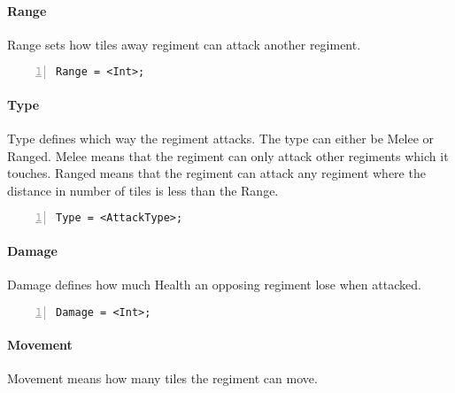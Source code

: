 		\paragraph{Range}
			Range sets how tiles away regiment can attack another regiment.

		\begin{lstlisting}[basicstyle=\small\sffamily,
		keywordstyle={\color{blue}},
		comment={[l]{//}}, morecomment={[s]{/*}{*/}}, commentstyle=\itshape,
		columns={[l]flexible}, numbers=left, numberstyle=\tiny,
		frameround=fftt, frame=shadowbox, captionpos=b,
		caption={Regiment Assignment},
		label=RegimentAssignment]
				Range = <Int>;
			\end{lstlisting}
		\paragraph{Type}
			Type defines which way the regiment attacks. The type can either be Melee or Ranged.
			Melee means that the regiment can only attack other regiments which it touches. Ranged means 
			that the regiment can attack any regiment where the distance in number of tiles is less than the Range.

		\begin{lstlisting}[basicstyle=\small\sffamily,
		keywordstyle={\color{blue}},
		comment={[l]{//}}, morecomment={[s]{/*}{*/}}, commentstyle=\itshape,
		columns={[l]flexible}, numbers=left, numberstyle=\tiny,
		frameround=fftt, frame=shadowbox, captionpos=b,
		caption={Regiment Assignment},
		label=RegimentAssignment]
				Type = <AttackType>; 
			\end{lstlisting}	
		\paragraph{Damage}
			Damage defines how much Health an opposing regiment lose when attacked.

		\begin{lstlisting}[basicstyle=\small\sffamily,
		keywordstyle={\color{blue}},
		comment={[l]{//}}, morecomment={[s]{/*}{*/}}, commentstyle=\itshape,
		columns={[l]flexible}, numbers=left, numberstyle=\tiny,
		frameround=fftt, frame=shadowbox, captionpos=b,
		caption={Regiment Assignment},
		label=RegimentAssignment]
				Damage = <Int>;
			\end{lstlisting}
		\paragraph{Movement}
			Movement means how many tiles the regiment can move.


